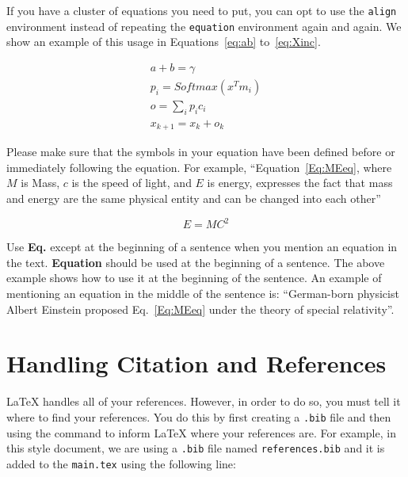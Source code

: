 \documentclass[12pt]{uomthesis}
\begin{document}
If you have a cluster of equations you need to put, you can opt to use the \texttt{align} environment instead of repeating the \texttt{equation} environment again and again. We show an example of this usage in Equations~\ref{eq:ab} to~\ref{eq:Xinc}.

\begin{align}
    a+b=\gamma\label{eq:ab}\\
    p_i = Softmax(x^Tm_i )\label{eq:sofm}\\
    o =\sum_{i}p_i c_i\label{eq:sumO}\\
    x_{k+1} = x_k + o_k\label{eq:Xinc}
\end{align}

Please make sure that the symbols in your equation have been defined before or immediately following the equation. For example, ``Equation~\ref{Eq:MEeq}, where $M$ is Mass, $c$ is the speed of light, and $E$ is energy, expresses the fact that mass and energy are the same physical entity and can be changed into each other''

\begin{equation}
E=MC^2
\label{Eq:MEeq}
\end{equation}

Use \textbf{Eq.} except at the beginning of a sentence when you mention an equation in the text. \textbf{Equation} should be used at the beginning of a sentence. The above example shows how to use it at the beginning of the sentence.  An example of mentioning an equation in the middle of the sentence is: ``German-born physicist Albert Einstein proposed Eq.~\ref{Eq:MEeq} under the theory of special relativity''.






\section{Handling Citation and References}
\label{Sec:Cite}

\LaTeX{} handles all of your references. However, in order to do so, you must tell it where to find your references. You do this by first creating a \texttt{.bib} file and then using the  command to inform \LaTeX{} where your references are. For example, in this style document, we are using a \texttt{.bib} file named \texttt{references.bib} and it is added to the \texttt{main.tex} using the following line:

\begin{indentedQuote}
\begin{verbatim}

\end{verbatim}
\end{indentedQuote}
\end{document}
